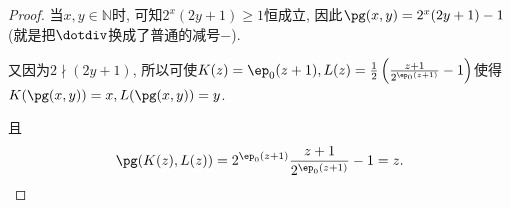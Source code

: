 \begin{proof}
    当$x,y\in\mathbb{N}$时, 可知$2^x(2y+1)\geqslant 1$恒成立, 因此$\pg(x,y)=2^x(2y+1)-1$(就是把$\dotdiv$换成了普通的减号$-$).

    又因为$2\nmid (2y+1)$, 所以可使$K(z)=\ep_0(z+1),L(z)=\frac12\left(\frac{z+1}{2^{\ep_0(z+1)}}-1\right)$使得$K(\pg(x,y))=x,L(\pg(x,y))=y$.

    且$$\pg(K(z),L(z))=2^{\ep_0(z+1)}\frac{z+1}{2^{\ep_0(z+1)}}-1=z.$$
\end{proof}
